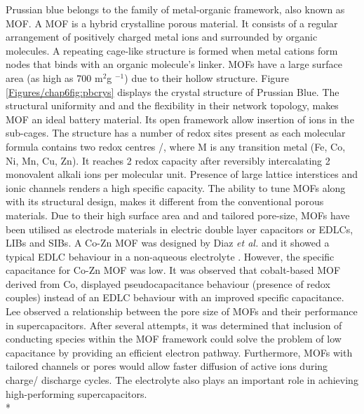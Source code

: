 Prussian blue belongs to the family of metal-organic framework, also known as MOF. A MOF is a hybrid crystalline porous material. It consists of a regular arrangement of positively charged metal ions and surrounded by organic molecules. A repeating cage-like structure is formed when metal cations form nodes that binds with an organic molecule's linker. MOFs have a large surface area (as high as 700 m$^{2}$g $^{-1}$) due to their hollow structure. Figure \ref{Figures/chap6fig:pbcrys} displays the crystal structure of Prussian Blue. The structural uniformity and and the flexibility in their network topology, makes MOF an ideal battery material. Its open framework allow insertion of ions in the sub-cages. The structure has a number of redox sites present as each molecular formula contains two redox centres /, where M is any transition metal (Fe, Co, Ni, Mn, Cu, Zn). It reaches 2 redox capacity after reversibly intercalating 2 monovalent alkali ions per molecular unit. Presence of large lattice interstices and ionic channels renders a high specific capacity. The ability to tune MOFs along with its structural design, makes it different from the conventional porous materials. Due to their high surface area and and tailored pore-size, MOFs have been utilised as electrode materials in electric double layer capacitors or EDLCs, LIBs and SIBs. A Co-Zn MOF was designed by Diaz \textit{et al.} and it showed a typical EDLC behaviour in a non-aqueous electrolyte \cite{diaz_co8-mof-5_2012}. However, the specific capacitance for Co-Zn MOF was low. It was observed that cobalt-based MOF derived from Co, displayed pseudocapacitance behaviour (presence of redox couples) instead of an EDLC behaviour with an improved specific capacitance. Lee  observed a relationship between the pore size of MOFs and their performance in supercapacitors. After several attempts, it was determined that inclusion of conducting species within the MOF framework could solve the problem of low capacitance by providing an efficient electron pathway. Furthermore, MOFs with tailored channels or pores would allow faster diffusion of active ions during charge/ discharge cycles. The electrolyte also plays an important role in achieving high-performing supercapacitors. \\*
